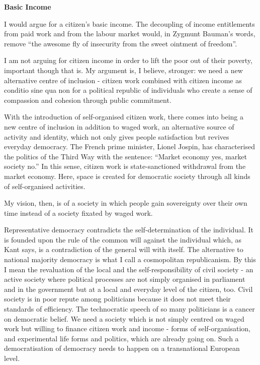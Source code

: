 \documentclass[
]{book}
\begin{document}
\textbf{Basic Income}

I would argue for a citizen's basic income.
The decoupling of income entitlements from paid work and from the labour market would, in Zygmunt Bauman's words, remove ``the awesome fly of insecurity from the sweet ointment of freedom''.

I am not arguing for citizen income in order to lift the poor out of their poverty, important though that is. My argument is, I believe, stronger: we need a new alternative centre of inclusion - citizen work combined with citizen income as conditio sine qua non for a political republic of individuals who create a sense of compassion and cohesion through public commitment.

With the introduction of self-organised citizen work, there comes into being a new centre of inclusion in addition to waged work, an alternative source of activity and identity, which not only gives people satisfaction but revives everyday democracy.
The French prime minister, Lionel Jospin, has characterised the politics of the Third Way with the sentence: ``Market economy yes, market society no.'' In this sense, citizen work is state-sanctioned withdrawal from the market economy. Here, space is created for democratic society through all kinds of self-organised activities.

My vision, then, is of a society in which people gain sovereignty over their own time instead of a society fixated by waged work.

Representative democracy contradicts the self-determination of the individual. It is founded upon the rule of the common will against the individual which, as Kant says, is a contradiction of the general will with itself. The alternative to national majority democracy is what I call a cosmopolitan republicanism. By this I mean the revaluation of the local and the self-responsibility of civil society - an active society where political processes are not simply organised in parliament and in the government but at a local and everyday level of the citizen, too. Civil society is in poor repute among politicians because it does not meet their standards of efficiency. The technocratic speech of so many politicians is a cancer on democratic belief. We need a society which is not simply centred on waged work but willing to finance citizen work and income - forms of self-organisation, and experimental life forms and politics, which are already going on. Such a democratisation of democracy needs to happen on a transnational European level.
\end{document}
